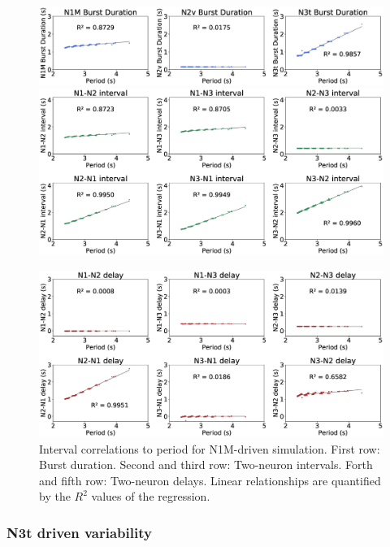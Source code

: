 \begin{figure}[h!]
    \centering
\includegraphics[width=\textwidth]{img/results-paper-modelo/figure6_row1.eps}
  \includegraphics[width=\textwidth]{img/results-paper-modelo/figure6_row2-3.eps}%
      
  \includegraphics[width=\textwidth]{img/results-paper-modelo/figure6_row4-5.eps}%

    \caption{Interval correlations to period for N1M-driven simulation. First row: Burst duration. Second and third row: Two-neuron intervals. Forth and fifth row: Two-neuron delays. Linear relationships are quantified by the $R^2$ values of the regression.}
    \label{fig:invariant n1m}
\end{figure}

\clearpage
\newpage

\subsubsection{N3t driven variability}

